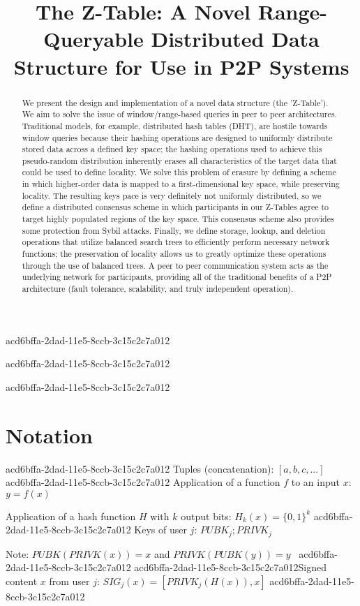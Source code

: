 \documentclass[12pt]{article}
\title{The Z-Table: A Novel Range-Queryable Distributed Data Structure for Use in P2P Systems}
\begin{document}
acd6bffa-2dad-11e5-8ccb-3c15c2c7a012
\maketitle

acd6bffa-2dad-11e5-8ccb-3c15c2c7a012\begin{abstract}
We present the design and implementation of a novel data structure (the 'Z-Table'). We aim to solve the issue of window/range-based queries in peer to peer architectures. Traditional models, for example,  distributed hash tables (DHT), are hostile towards window queries because their hashing operations are designed to uniformly distribute stored data across a defined key space; the hashing operations used to achieve this pseudo-random distribution inherently erases all characteristics of the target data that could be used to define locality. We solve this problem of erasure by defining a scheme in which higher-order data is mapped to a first-dimensional key space, while preserving locality. The resulting keys pace is very definitely not uniformly distributed, so we define a distributed consensus scheme in which participants in our Z-Tables agree to target highly populated regions of the key space. This consensus scheme also provides some protection from Sybil attacks. Finally, we define storage, lookup, and deletion operations that utilize balanced search trees to efficiently perform necessary network functions; the preservation of locality allows us to greatly optimize these operations through the use of balanced trees. A peer to peer communication system acts as the underlying network for participants, providing all of the traditional benefits of a P2P architecture (fault tolerance, scalability, and truly independent operation).
\end{abstract}

acd6bffa-2dad-11e5-8ccb-3c15c2c7a012\section{Notation}
acd6bffa-2dad-11e5-8ccb-3c15c2c7a012
Tuples (concatenation): $[a,b,c,...]$
acd6bffa-2dad-11e5-8ccb-3c15c2c7a012
Application of a function $f$ to an input $x$: $y=f(x)$

Application of a hash function $H$ with $k$ output bits: $H_{k}(x) = \{0,1\}^k$
acd6bffa-2dad-11e5-8ccb-3c15c2c7a012
Keys of user $j$: $ PUBK_j; PRIVK_j $

Note: $PUBK(PRIVK(x)) = x$ and $PRIVK(PUBK(y)) = y$~
acd6bffa-2dad-11e5-8ccb-3c15c2c7a012
acd6bffa-2dad-11e5-8ccb-3c15c2c7a012Signed content $x$ from user $j$: $SIG_j(x) = \left[ PRIVK_j( H(x) ), x \right]$
acd6bffa-2dad-11e5-8ccb-3c15c2c7a012
\end{document}
